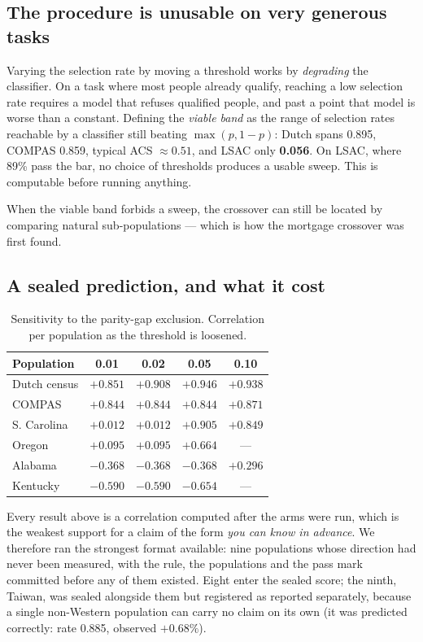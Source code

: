 \documentclass[conference]{IEEEtran}
\begin{document}
\subsection{The procedure is unusable on very generous tasks}

Varying the selection rate by moving a threshold works by \emph{degrading} the classifier. On a
task where most people already qualify, reaching a low selection rate requires a model that
refuses qualified people, and past a point that model is worse than a constant. Defining the
\emph{viable band} as the range of selection rates reachable by a classifier still beating
$\max(p, 1-p)$: Dutch spans 0.895, COMPAS 0.859, typical ACS $\approx 0.51$, and LSAC only
\textbf{0.056}. On LSAC, where 89\% pass the bar, no choice of thresholds produces a usable
sweep. This is computable before running anything.

When the viable band forbids a sweep, the crossover can still be located by comparing natural
sub-populations --- which is how the mortgage crossover was first found.

\subsection{A sealed prediction, and what it cost}
\label{sec:sealed}

\begin{table}[t]
\caption{Sensitivity to the parity-gap exclusion. Correlation per population as the
threshold is loosened.}
\label{tab:sensitivity}
\centering
\footnotesize
\setlength{\tabcolsep}{5pt}
\begin{tabular}{@{}lcccc@{}}
\toprule
\textbf{Population} & \textbf{0.01} & \textbf{0.02} & \textbf{0.05} & \textbf{0.10} \\
\midrule
Dutch census & $+0.851$ & $+0.908$ & $+0.946$ & $+0.938$ \\
COMPAS & $+0.844$ & $+0.844$ & $+0.844$ & $+0.871$ \\
S. Carolina & $+0.012$ & $+0.012$ & $+0.905$ & $+0.849$ \\
Oregon & $+0.095$ & $+0.095$ & $+0.664$ & --- \\
Alabama & $-0.368$ & $-0.368$ & $-0.368$ & $+0.296$ \\
Kentucky & $-0.590$ & $-0.590$ & $-0.654$ & --- \\
\bottomrule
\end{tabular}
\end{table}

Every result above is a correlation computed after the arms were run, which is the weakest
support for a claim of the form \emph{you can know in advance}. We therefore ran the strongest
format available: nine populations whose direction had never been measured, with the rule, the
populations and the pass mark committed before any of them existed. Eight enter the sealed
score; the ninth, Taiwan, was sealed alongside them but registered as reported separately,
because a single non-Western population can carry no claim on its own (it was predicted
correctly: rate 0.885, observed $+0.68\%$).
\end{document}
